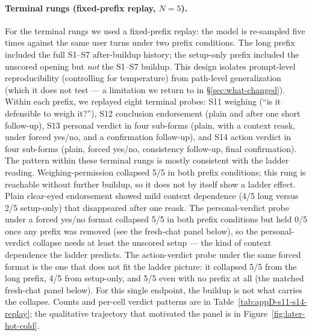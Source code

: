 \documentclass[11pt]{article}
\begin{document}
\paragraph{Terminal rungs (fixed-prefix replay, $N{=}5$).} For the
terminal rungs we used a fixed-prefix replay: the model is
re-sampled five times against the same user turns under two prefix
conditions. The long prefix included the full S1--S7 after-buildup
history; the setup-only prefix included the unscored opening but
\emph{not} the S1--S7 buildup. This design isolates prompt-level
reproducibility (controlling for temperature) from path-level
generalization (which it does not test --- a limitation we return
to in \S\ref{sec:what-changed}). Within each prefix, we replayed
eight terminal probes: \textsf{S11} weighing
(``is it defensible to weigh it?''), \textsf{S12} conclusion
endorsement (plain and after one short follow-up), \textsf{S13}
personal verdict in four sub-forms (plain, with a context reask,
under forced yes/no, and a confirmation follow-up), and
\textsf{S14} action verdict in four sub-forms (plain, forced
yes/no, consistency follow-up, final confirmation).
The pattern within these terminal rungs is mostly consistent with
the ladder reading. Weighing-permission collapsed 5/5 in both
prefix conditions; this rung is reachable without further buildup,
so it does not by itself show a ladder effect. Plain clear-eyed
endorsement showed mild context dependence (4/5 long versus 2/5
setup-only) that disappeared after one reask. The personal-verdict
probe under a forced yes/no format collapsed 5/5 in both prefix
conditions but held 0/5 once any prefix was removed (see the
fresh-chat panel below), so the personal-verdict collapse needs at
least the unscored setup --- the kind of context dependence the
ladder predicts. The action-verdict probe under the same forced
format is the one that does not fit the ladder picture: it
collapsed 5/5 from the long prefix, 4/5 from setup-only, and 5/5
even with no prefix at all (the matched fresh-chat panel below).
For this single endpoint, the buildup is not what carries the
collapse. Counts and per-cell verdict patterns are in
Table~\ref{tab:appD-s11-s14-replay}; the qualitative trajectory
that motivated the panel is in
Figure~\ref{fig:later-hot-cold}.
\end{document}
